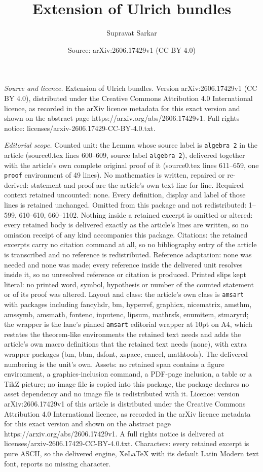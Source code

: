\documentclass[10pt,a4paper]{amsart}
\title[Extension of Ulrich bundles]{Extension of Ulrich bundles}
\author{Supravat Sarkar}
\date{Source: arXiv:2606.17429v1 (CC BY 4.0)}
\begin{document}
\maketitle

\noindent\emph{Source and licence.} Extension of Ulrich bundles. Version arXiv:2606.17429v1 (CC BY 4.0), distributed under the Creative Commons Attribution 4.0 International licence, as recorded in the arXiv licence metadata for this exact version and shown on the abstract page https://arxiv.org/abs/2606.17429v1. Full rights notice: licenses/arxiv-2606.17429-CC-BY-4.0.txt.\par\smallskip

\noindent\textit{Editorial scope.} Counted unit: the Lemma whose source label is \texttt{algebra 2} in the article (source0.tex lines 600--609, source label \texttt{algebra 2}), delivered together with the article's own complete original proof of it (source0.tex lines 611--659, one \texttt{proof} environment of 49 lines). No mathematics is written, repaired or re-derived: statement and proof are the article's own text line for line. Required context retained uncounted: none. Every definition, display and label of those lines is retained unchanged. Omitted from this package and not redistributed: 1--599, 610--610, 660--1102. Nothing inside a retained excerpt is omitted or altered: every retained body is delivered exactly as the article's lines are written, so no omission receipt of any kind accompanies this package. Citations: the retained excerpts carry no citation command at all, so no bibliography entry of the article is transcribed and no reference is redistributed. Reference adaptation: none was needed and none was made; every reference inside the delivered unit resolves inside it, so no unresolved reference or citation is produced. Printed slips kept literal: no printed word, symbol, hypothesis or number of the counted statement or of its proof was altered. Layout and class: the article's own class is \texttt{amsart} with packages including fancyhdr, bm, hyperref, graphicx, nicematrix, amsthm, amssymb, amsmath, fontenc, inputenc, lipsum, mathrsfs, enumitem, stmaryrd; the wrapper is the lane's pinned \texttt{amsart} editorial wrapper at 10pt on A4, which restates the theorem-like environments the retained text needs and adds the article's own macro definitions that the retained text needs (none), with extra wrapper packages (bm, bbm, dsfont, xspace, cancel, mathtools). The delivered numbering is the unit's own. Assets: no retained span contains a figure environment, a graphics-inclusion command, a PDF-page inclusion, a table or a TikZ picture; no image file is copied into this package, the package declares no asset dependency and no image file is redistributed with it. Licence: version arXiv:2606.17429v1 of this article is distributed under the Creative Commons Attribution 4.0 International licence, as recorded in the arXiv licence metadata for this exact version and shown on the abstract page https://arxiv.org/abs/2606.17429v1. A full rights notice is delivered at licenses/arxiv-2606.17429-CC-BY-4.0.txt. Characters: every retained excerpt is pure ASCII, so the delivered engine, XeLaTeX with its default Latin Modern text font, reports no missing character.
\end{document}

